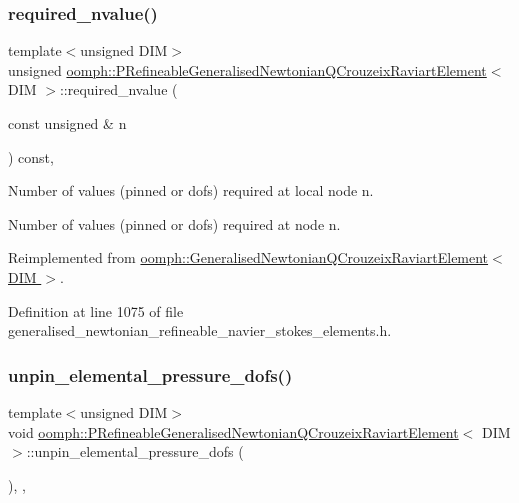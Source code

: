 \subsubsection{\texorpdfstring{required\+\_\+nvalue()}{required\_nvalue()}}
{\footnotesize\ttfamily template$<$unsigned D\+IM$>$ \\
unsigned \hyperlink{classoomph_1_1PRefineableGeneralisedNewtonianQCrouzeixRaviartElement}{oomph\+::\+P\+Refineable\+Generalised\+Newtonian\+Q\+Crouzeix\+Raviart\+Element}$<$ D\+IM $>$\+::required\+\_\+nvalue (\begin{DoxyParamCaption}\item[{const unsigned \&}]{n }\end{DoxyParamCaption}) const\hspace{0.3cm}{\ttfamily [inline]}, {\ttfamily [virtual]}}



Number of values (pinned or dofs) required at local node n. 

Number of values (pinned or dofs) required at node n. 

Reimplemented from \hyperlink{classoomph_1_1GeneralisedNewtonianQCrouzeixRaviartElement_aaa3786b1a111c82a5ee7ee47e8e45eb0}{oomph\+::\+Generalised\+Newtonian\+Q\+Crouzeix\+Raviart\+Element$<$ D\+I\+M $>$}.



Definition at line 1075 of file generalised\+\_\+newtonian\+\_\+refineable\+\_\+navier\+\_\+stokes\+\_\+elements.\+h.

\mbox{\label{classoomph_1_1PRefineableGeneralisedNewtonianQCrouzeixRaviartElement_a2e603c22bdef7f5a9ebf82dd46a3fae2}} 
\subsubsection{\texorpdfstring{unpin\+\_\+elemental\+\_\+pressure\+\_\+dofs()}{unpin\_elemental\_pressure\_dofs()}}
{\footnotesize\ttfamily template$<$unsigned D\+IM$>$ \\
void \hyperlink{classoomph_1_1PRefineableGeneralisedNewtonianQCrouzeixRaviartElement}{oomph\+::\+P\+Refineable\+Generalised\+Newtonian\+Q\+Crouzeix\+Raviart\+Element}$<$ D\+IM $>$\+::unpin\+\_\+elemental\+\_\+pressure\+\_\+dofs (\begin{DoxyParamCaption}{ }\end{DoxyParamCaption})\hspace{0.3cm}{\ttfamily [inline]}, {\ttfamily [private]}, {\ttfamily [virtual]}}



